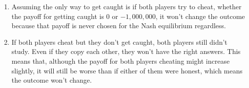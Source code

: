 \documentclass[letterpaper]{article}
\begin{document}
\begin{enumerate}
\begin{enumerate}
        \item Assuming the only way to get caught is if both players try to cheat, whether the payoff for getting caught is $0$ or $-1,000,000$, it won't change the outcome because that payoff is never chosen for the Nash equilibrium regardless.
        \item If both players cheat but they don't get caught, both players still didn't study. Even if they copy each other, they won't have the right answers. This means that, although the payoff for both players cheating might increase slightly, it will still be worse than if either of them were honest, which means the outcome won't change.
    \end{enumerate}
\end{enumerate}
\end{document}
